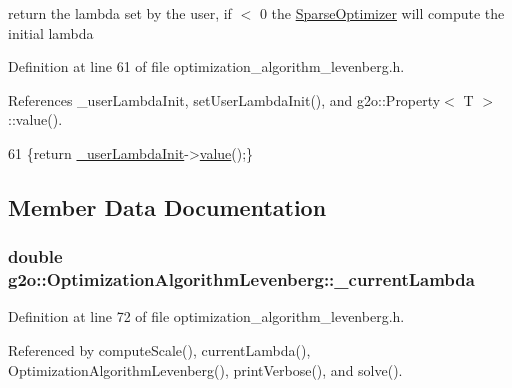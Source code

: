 return the lambda set by the user, if $<$ 0 the \hyperlink{classg2o_1_1SparseOptimizer}{Sparse\+Optimizer} will compute the initial lambda 



Definition at line 61 of file optimization\+\_\+algorithm\+\_\+levenberg.\+h.



References \+\_\+user\+Lambda\+Init, set\+User\+Lambda\+Init(), and g2o\+::\+Property$<$ T $>$\+::value().


\begin{DoxyCode}
61 \{\textcolor{keywordflow}{return} \hyperlink{classg2o_1_1OptimizationAlgorithmLevenberg_a021c97d3f8205ec2ae7fde147f98b452}{\_userLambdaInit}->\hyperlink{classg2o_1_1Property_aefa3e7a5fcb2c8e061ecb07485f1371c}{value}();\}
\end{DoxyCode}


\subsection{Member Data Documentation}
\subsubsection[{\texorpdfstring{\+\_\+current\+Lambda}{_currentLambda}}]{\setlength{\rightskip}{0pt plus 5cm}double g2o\+::\+Optimization\+Algorithm\+Levenberg\+::\+\_\+current\+Lambda\hspace{0.3cm}{\ttfamily [protected]}}\hypertarget{classg2o_1_1OptimizationAlgorithmLevenberg_aec7bba815e20361aa7ccc4661f90a034}{}\label{classg2o_1_1OptimizationAlgorithmLevenberg_aec7bba815e20361aa7ccc4661f90a034}


Definition at line 72 of file optimization\+\_\+algorithm\+\_\+levenberg.\+h.



Referenced by compute\+Scale(), current\+Lambda(), Optimization\+Algorithm\+Levenberg(), print\+Verbose(), and solve().

